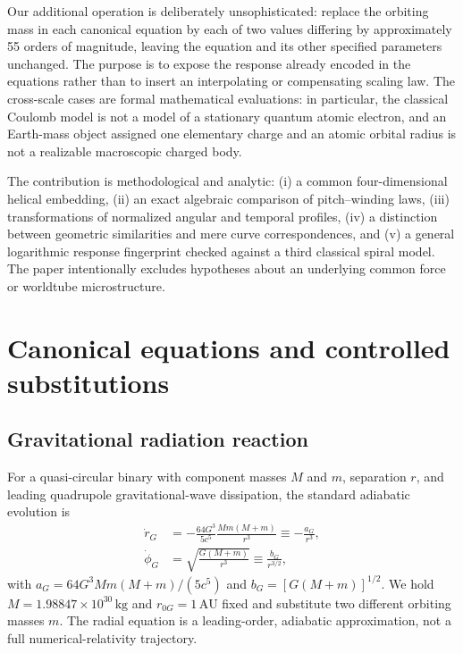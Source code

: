 \documentclass[aps,prd,reprint,onecolumn,superscriptaddress,nofootinbib]{revtex4-2}
\begin{document}
Our additional operation is deliberately unsophisticated: replace the orbiting mass in each canonical equation by each of two values differing by approximately 55 orders of magnitude, leaving the equation and its other specified parameters unchanged. The purpose is to expose the response already encoded in the equations rather than to insert an interpolating or compensating scaling law. The cross-scale cases are formal mathematical evaluations: in particular, the classical Coulomb model is not a model of a stationary quantum atomic electron, and an Earth-mass object assigned one elementary charge and an atomic orbital radius is not a realizable macroscopic charged body.

The contribution is methodological and analytic: (i) a common four-dimensional helical embedding, (ii) an exact algebraic comparison of pitch--winding laws, (iii) transformations of normalized angular and temporal profiles, (iv) a distinction between geometric similarities and mere curve correspondences, and (v) a general logarithmic response fingerprint checked against a third classical spiral model. The paper intentionally excludes hypotheses about an underlying common force or worldtube microstructure.

\section{Canonical equations and controlled substitutions}
\subsection{Gravitational radiation reaction}
For a quasi-circular binary with component masses $M$ and $m$, separation $r$, and leading quadrupole gravitational-wave dissipation, the standard adiabatic evolution is \cite{peters1964,maggiore2008}
\begin{align}
 \dot r_G&=-\frac{64G^3}{5c^5}\frac{Mm(M+m)}{r^3}\equiv-\frac{a_G}{r^3},\\
 \dot\phi_G&=\sqrt{\frac{G(M+m)}{r^3}}\equiv\frac{b_G}{r^{3/2}},\label{eq:G}
\end{align}
with $a_G=64G^3Mm(M+m)/(5c^5)$ and $b_G=[G(M+m)]^{1/2}$. We hold $M=1.98847\times10^{30}\,\mathrm{kg}$ and $r_{0G}=1\,\mathrm{AU}$ fixed and substitute two different orbiting masses $m$. The radial equation is a leading-order, adiabatic approximation, not a full numerical-relativity trajectory.
\end{document}
